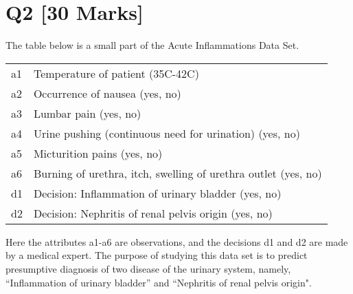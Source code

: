 \section*{Q2 [30 Marks]}

The table below is a small part of the Acute Inflammations Data Set.

\begin{table}[H]
    \begin{tabular}{ll}
        a1 & Temperature of patient (35C-42C) \\
        a2 & Occurrence of nausea (yes, no) \\
        a3 & Lumbar pain (yes, no) \\
        a4 & Urine pushing (continuous need for urination) (yes, no) \\
        a5 & Micturition pains (yes, no) \\
        a6 & Burning of urethra, itch, swelling of urethra outlet (yes, no) \\
        d1 & Decision: Inflammation of urinary bladder (yes, no) \\
        d2 & Decision: Nephritis of renal pelvis origin (yes, no) \\
    \end{tabular}
\end{table}

Here the attributes a1-a6 are observations, and the decisions d1 and d2 are made by a
medical expert. The purpose of studying this data set is to predict presumptive diagnosis
of two disease of the urinary system, namely, “Inflammation of urinary bladder” and
“Nephritis of renal pelvis origin".

